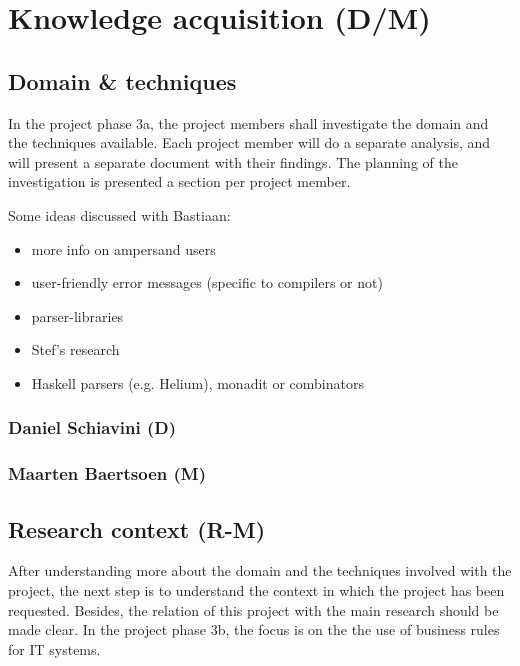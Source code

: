 
\section{Knowledge acquisition (D/M)}
\label{sec:knowledge-acquisition}

\subsection{Domain \& techniques}
%
In the project phase 3a, the project members shall investigate the domain and the techniques available.
Each project member will do a separate analysis, and will present a separate document with their findings.
The planning of the investigation is presented a section per project member.

Some ideas discussed with Bastiaan:
\begin{itemize}
  \item more info on ampersand users
  \item user-friendly error messages (specific to compilers or not)
  \item parser-libraries
  \item Stef's research
  \item Haskell parsers (e.g. Helium), monadit or combinators
\end{itemize}

\subsubsection{Daniel Schiavini (D)}
\lipsum[1]

\subsubsection{Maarten Baertsoen (M)}
\lipsum[1]

\subsection{Research context (R-M)}
%
After understanding more about the domain and the techniques involved with the project, the next step is to understand the context in which the project has been requested.
Besides, the relation of this project with the main research should be made clear.
In the project phase 3b, the focus is on the the use of business rules for IT systems.

